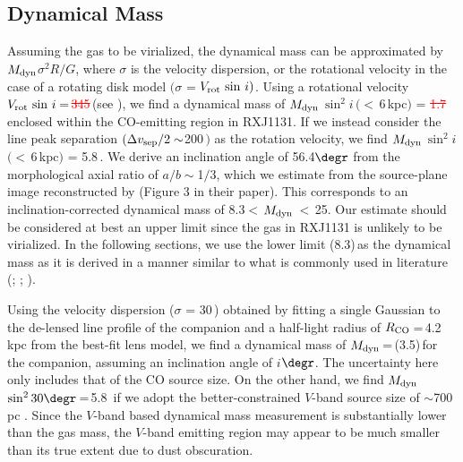 \documentclass[]{emulateapj}
\newcommand{\new}[1]{\textcolor{blue}{\uwave{#1}}}
\newcommand{\old}[1]{\textcolor{red}{\st{#1}}} %
\begin{document}
\subsection{Dynamical Mass}\label{sec:dyn}
Assuming the gas to be virialized,
the dynamical mass can be approximated by
$M_{\rm dyn}$\ssim$\sigma^2 R / G$,
where $\sigma$ is the velocity dispersion, or the rotational velocity in the case of a rotating disk model
$($\ie $\sigma$ = $V_{\rm rot}\, \sin\, i)$.
Using a rotational velocity $V_{\rm rot} \, \sin\, i$\,=\,\old{345}\new{303}\,\kms (see ),
we find a dynamical mass of
$M_{\rm dyn}$\,$\sin^2 i$\,$(<$\,6\,kpc$)$ = \old{1.7}\new{1.3}\,\Msun enclosed
within the CO-emitting region in RXJ1131.
If we instead consider the
\bco line peak separation $(\Delta v_{\rm sep}/2 \sim$200\,\kms$)$ as the rotation velocity, we find
$M_{\rm dyn}$\,$\sin^2 i$\,$(<$\,6\,kpc$)$ = 5.8\,\Msun.
We derive an inclination angle of 56.4$\degr$ from the
morphological axial ratio of $a/b\sim$1$/$3, which we estimate
from the source-plane image reconstructed by  (Figure 3 in their paper).
This corresponds to an inclination-corrected dynamical mass of
8.3\Msun$<$\,$M_{\rm dyn}$\,$<$\,25\Msun.
Our estimate should be considered at best an upper limit since
the gas in RXJ1131 is unlikely to be virialized.
In the following sections, we use the
lower limit (8.3)\,\Msun as the dynamical mass as it is
derived in a manner similar to what is commonly used in literature
(\eg \citealt[hereafter S97]{Solomon97a}; \citealt[hereafter DS98]{Downes98a}; \citealt[hereafter G05]{Greve05a}).

Using the velocity dispersion ($\sigma$ = 30\,\kms) obtained by fitting a single Gaussian to the
de-lensed line profile of the companion and a
half-light radius of $R_{\rm CO}$\,=\,4.2\,kpc from the best-fit lens model,
we find a dynamical mass of
$M_{\rm dyn}$\,=\,(3.5)\,\Msun for the companion,
assuming an inclination angle of $i$$\degr$.
The uncertainty here only includes that of the CO source size.
On the other hand,
we find $M_{\rm dyn}$\,$\sin^2 30\degr$\,=\,5.8\,\Msun
if we adopt the better-constrained $V$-band source size of $\sim$700\,pc .
Since the $V$-band based dynamical mass measurement is substantially lower than the gas mass,
the $V$-band emitting region may appear to be much smaller than its true extent due
to dust obscuration.
\end{document}
